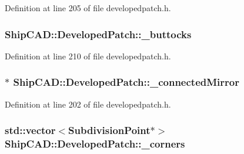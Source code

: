 Definition at line 205 of file developedpatch.\+h.

\subsubsection[{\texorpdfstring{\+\_\+buttocks}{_buttocks}}]{ Ship\+C\+A\+D\+::\+Developed\+Patch\+::\+\_\+buttocks\hspace{0.3cm}{\ttfamily [protected]}}\hypertarget{classShipCAD_1_1DevelopedPatch_a22b335fdb32b04aab580fc1dd90e0481}{}\label{classShipCAD_1_1DevelopedPatch_a22b335fdb32b04aab580fc1dd90e0481}


Definition at line 210 of file developedpatch.\+h.

\subsubsection[{\texorpdfstring{\+\_\+connected\+Mirror}{_connectedMirror}}]{$\ast$ Ship\+C\+A\+D\+::\+Developed\+Patch\+::\+\_\+connected\+Mirror\hspace{0.3cm}{\ttfamily [protected]}}\hypertarget{classShipCAD_1_1DevelopedPatch_a425239fe90e8afd53ad126a1afdce42f}{}\label{classShipCAD_1_1DevelopedPatch_a425239fe90e8afd53ad126a1afdce42f}


Definition at line 202 of file developedpatch.\+h.

\subsubsection[{\texorpdfstring{\+\_\+corners}{_corners}}]{\setlength{\rightskip}{0pt plus 5cm}std\+::vector$<${\bf Subdivision\+Point}$\ast$$>$ Ship\+C\+A\+D\+::\+Developed\+Patch\+::\+\_\+corners\hspace{0.3cm}{\ttfamily [protected]}}\hypertarget{classShipCAD_1_1DevelopedPatch_ae668e0bc0c43821a883881c752fd4725}{}\label{classShipCAD_1_1DevelopedPatch_ae668e0bc0c43821a883881c752fd4725}


